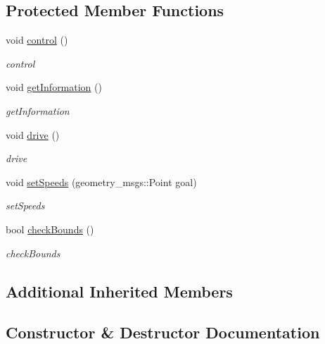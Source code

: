 \subsection*{Protected Member Functions}
\begin{DoxyCompactItemize}
\item 
void \hyperlink{classBscPilot_a42240aa898a2719f14d816bbe08a0f3f}{control} ()
\begin{DoxyCompactList}\small\item\em control \end{DoxyCompactList}\item 
void \hyperlink{classBscPilot_aa40dc622dc2c856c0a8b2e8c61970f00}{get\+Information} ()
\begin{DoxyCompactList}\small\item\em get\+Information \end{DoxyCompactList}\item 
void \hyperlink{classBscPilot_af73cc7f821a08574eae05be8c5806646}{drive} ()
\begin{DoxyCompactList}\small\item\em drive \end{DoxyCompactList}\item 
void \hyperlink{classBscPilot_a9f8ae1db08a3e84fed7c44d3bad3504b}{set\+Speeds} (geometry\+\_\+msgs\+::\+Point goal)
\begin{DoxyCompactList}\small\item\em set\+Speeds \end{DoxyCompactList}\item 
bool \hyperlink{classBscPilot_a62b5a5aaec0f9359afecd77da05e3811}{check\+Bounds} ()
\begin{DoxyCompactList}\small\item\em check\+Bounds \end{DoxyCompactList}\end{DoxyCompactItemize}
\subsection*{Additional Inherited Members}


\subsection{Constructor \& Destructor Documentation}
\mbox{\label{classBscPilot_a78e73052c348955803e00bed5dfa5e4b}} 
